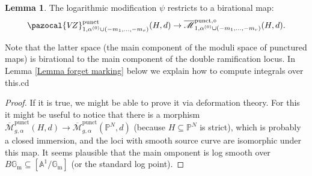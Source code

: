 \documentclass[11pt]{amsart}
\newcommand{\Mpunct}[4]{\overline{\mathcal{M}}^{\operatorname{punct}}_{#1,#2}(#3,#4)}
\newcommand{\PP}{\mathbb P}
\newcommand{\VZ}{\pazocal{V\!Z}}
\renewcommand{\to}{\rightarrow}
\newcommand{\Aaff}{\mathbb{A}}
\newcommand{\Gm}{\mathbb{G}_{\text{m}}}
\newcommand{\Mcal}{\mathcal{M}}
\newcommand{\ol}[1]{\overline{#1}}
\theoremstyle{definition}
\newtheorem{lem}[thm]{Lemma}
\theoremstyle{definition}
\begin{document}
\begin{lem} The logarithmic modification $\psi$ restricts to a birational map:
\begin{equation*}\VZ^{\operatorname{punct}}_{1,\alpha^{(0)}\cup(-m_1,\ldots,-m_r)}(H,d) \to \ol\Mcal^{\operatorname{punct},\circ}_{1,\alpha^{(0)}\cup(-m_1,\ldots,-m_r)}(H,d).\end{equation*}
\end{lem}
Note that the latter space (the main component of the moduli space of punctured maps) is birational to the main component of the double ramification locus. In Lemma \ref{Lemma forget marking} below we explain how to compute integrals over this.cd 
\begin{proof}
If it is true, we might be able to prove it via deformation theory. For this it might be useful to notice that there is a morphism $\Mpunct{g}{\alpha}{H}{d}\to \Mpunct{g}{\alpha}{\PP^N}{d}$ (because $H\subseteq\PP^N$ is strict), which is probably a closed immersion, and the loci with smooth source curve are isomorphic under this map. It seems plausible that the main omponent is log smooth over $B\Gm\subseteq[\Aaff^1/\Gm]$ (or the standard log point).
\end{proof}
\end{document}
